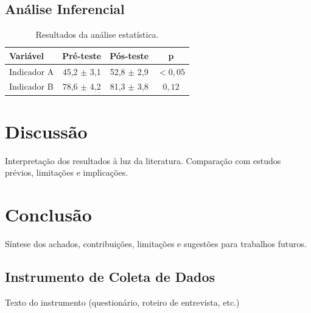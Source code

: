 \documentclass[
  12pt,
  openright,
  twoside,
  a4paper,
  brazilian
]{abntex2}
\begin{document}
\section{Análise Inferencial}

\begin{table}[H]
\centering
\caption{Resultados da análise estatística.}
\label{tab:resultados}
\begin{tabular}{lccc}
\toprule
\textbf{Variável} & \textbf{Pré-teste} & \textbf{Pós-teste} & \textbf{p} \\
\midrule
Indicador A & 45,2 $\pm$ 3,1 & 52,8 $\pm$ 2,9 & $< 0,05$ \\
Indicador B & 78,6 $\pm$ 4,2 & 81,3 $\pm$ 3,8 & $0,12$ \\
\bottomrule
\end{tabular}
\end{table}

\chapter[Discussão]{Discussão}

Interpretação dos resultados à luz da literatura. Comparação com estudos
prévios, limitações e implicações.

\chapter[Conclusão]{Conclusão}

Síntese dos achados, contribuições, limitações e sugestões para trabalhos
futuros.

\postextual




\begin{apendicesenv}
\partapendices

\chapter{Instrumento de Coleta de Dados}
Texto do instrumento (questionário, roteiro de entrevista, etc.)

\end{apendicesenv}

%
%

\end{document}
